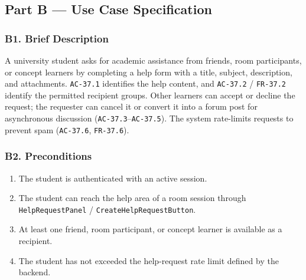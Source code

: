 \documentclass[12pt]{article}
\begin{document}
\hypertarget{sec:part-b-use-case-specification}{}
\subsection*{Part B --- Use Case Specification}
\par\medskip

\hypertarget{sec:b1-brief-description}{}
\subsubsection*{B1. Brief Description}
\par\medskip

A university student asks for academic assistance from friends, room participants, or concept learners by completing a help form with a title, subject, description, and attachments. \texttt{AC-37.1} identifies the help content, and \texttt{AC-37.2} / \texttt{FR-37.2} identify the permitted recipient groups. Other learners can accept or decline the request; the requester can cancel it or convert it into a forum post for asynchronous discussion (\texttt{AC-37.3}--\texttt{AC-37.5}). The system rate-limits requests to prevent spam (\texttt{AC-37.6}, \texttt{FR-37.6}).
\par\medskip

\hypertarget{sec:b2-preconditions}{}
\subsubsection*{B2. Preconditions}
\par\medskip

\begin{enumerate}
\item The student is authenticated with an active session.
\item The student can reach the help area of a room session through \texttt{HelpRequestPanel} / \texttt{CreateHelpRequestButton}.
\item At least one friend, room participant, or concept learner is available as a recipient.
\item The student has not exceeded the help-request rate limit defined by the backend.
\end{enumerate}
\par\medskip

\hypertarget{sec:b3-postconditions}{}
\end{document}
